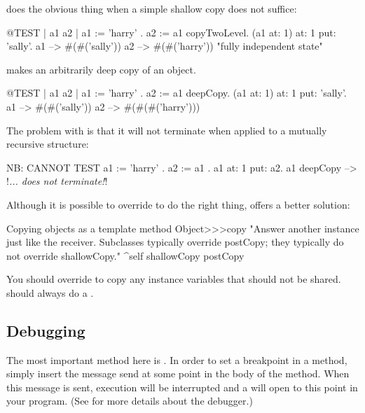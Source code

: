 \documentclass[a4paper,10pt,twoside]{book}
\begin{document}
 does the obvious thing when a simple shallow copy does not suffice:

\begin{code}{@TEST | a1 a2 |}
a1 := { { 'harry' } } .
a2 := a1 copyTwoLevel.
(a1 at: 1) at: 1 put: 'sally'.
a1 --> #(#('sally'))
a2 --> #(#('harry'))    "fully independent state"
\end{code}

 makes an arbitrarily deep copy of an object.

\begin{code}{@TEST | a1 a2 |}
a1 := { { { 'harry' } } } .
a2 := a1 deepCopy.
(a1 at: 1) at: 1 put: 'sally'.
a1 --> #(#('sally'))
a2 --> #(#(#('harry')))
\end{code}

The problem with  is that it will not terminate when applied to a mutually recursive structure:

\begin{code}{NB: CANNOT TEST}
a1 := { 'harry' }.
a2 := { a1 }.
a1 at: 1 put: a2.
a1 deepCopy --> !\emph{... does not terminate!}!
\end{code}

Although it is possible to override  to do the right thing,  offers a better solution:

\begin{method}{Copying objects as a template method}
Object>>>copy
    "Answer another instance just like the receiver. Subclasses typically override postCopy;
    they typically do not override shallowCopy."
    ^self shallowCopy postCopy
\end{method}

You should override  to copy any instance variables that should not be shared.  should always do a .


\subsection{Debugging}

The most important method here is . In order to set a breakpoint in a method, simply insert the message send  at some point in the body of the method.  When this message is sent, execution will be interrupted and a  will open to this point in your program.
(See  for more details about the debugger.)
\end{document}
